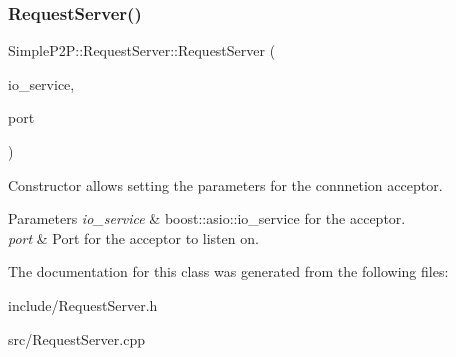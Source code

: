 \subsubsection{\texorpdfstring{Request\+Server()}{RequestServer()}}
{\footnotesize\ttfamily Simple\+P2\+P\+::\+Request\+Server\+::\+Request\+Server (\begin{DoxyParamCaption}\item[{boost\+::asio\+::io\+\_\+service \&}]{io\+\_\+service,  }\item[{Uint16}]{port }\end{DoxyParamCaption})}



Constructor allows setting the parameters for the connnetion acceptor. 


\begin{DoxyParams}{Parameters}
{\em io\+\_\+service} & boost\+::asio\+::io\+\_\+service for the acceptor. \\
\hline
{\em port} & Port for the acceptor to listen on. \\
\hline
\end{DoxyParams}


The documentation for this class was generated from the following files\+:\begin{DoxyCompactItemize}
\item 
include/Request\+Server.\+h\item 
src/Request\+Server.\+cpp\end{DoxyCompactItemize}
